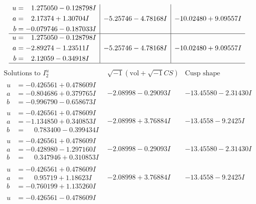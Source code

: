 \documentclass[1p]{elsarticle_modified}
\theoremstyle{definition}
\newcommand{\I}{\sqrt{-1}}
\begin{document}
$$\begin{array}{c|c|c}
\begin{aligned}
u &= \phantom{-}1.275050 - 0.128798 I \\
a &= \phantom{-}2.17374 + 1.30704 I \\
b &= -0.079746 - 0.187033 I\end{aligned}
 & -5.25746 - 4.78168 I & -10.02480 + 9.09557 I \\ \hline\begin{aligned}
u &= \phantom{-}1.275050 - 0.128798 I \\
a &= -2.89274 - 1.23511 I \\
b &= \phantom{-}2.12059 - 0.34918 I\end{aligned}
 & -5.25746 - 4.78168 I & -10.02480 + 9.09557 I\\
 \hline 
 \end{array}$$\newpage$$\begin{array}{c|c|c}  
\text{Solutions to }I^u_{2}& \I (\text{vol} + \sqrt{-1}CS) & \text{Cusp shape}\\
 \hline 
\begin{aligned}
u &= -0.426561 + 0.478609 I \\
a &= -0.804686 + 0.379765 I \\
b &= -0.996790 - 0.658673 I\end{aligned}
 & -2.08998 - 0.29093 I & -13.45580 - 2.31430 I \\ \hline\begin{aligned}
u &= -0.426561 + 0.478609 I \\
a &= -1.134850 + 0.340853 I \\
b &= \phantom{-}0.783400 - 0.399434 I\end{aligned}
 & -2.08998 + 3.76884 I & -13.4558 - 9.2425 I \\ \hline\begin{aligned}
u &= -0.426561 + 0.478609 I \\
a &= -0.428980 - 1.297160 I \\
b &= \phantom{-}0.347946 + 0.310853 I\end{aligned}
 & -2.08998 - 0.29093 I & -13.45580 - 2.31430 I \\ \hline\begin{aligned}
u &= -0.426561 + 0.478609 I \\
a &= \phantom{-}0.95719 + 1.18623 I \\
b &= -0.760199 + 1.135260 I\end{aligned}
 & -2.08998 + 3.76884 I & -13.4558 - 9.2425 I \\ \hline\begin{aligned}
u &= -0.426561 - 0.478609 I \\

\end{aligned}
\end{array}$$
\end{document}
